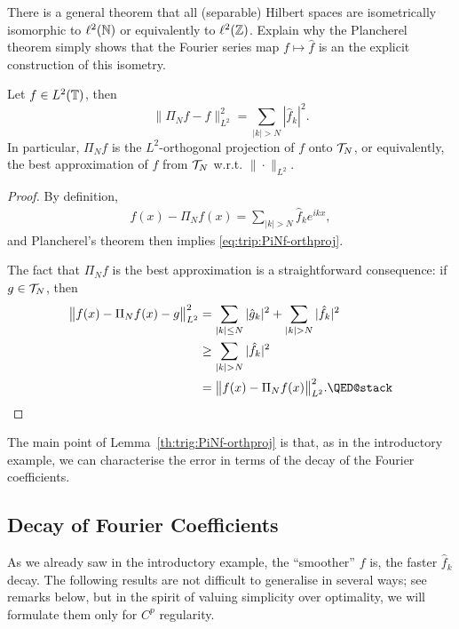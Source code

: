 \begin{remark}
  There is a general theorem that all (separable) Hilbert spaces are
  isometrically isomorphic to $\ell^2(\mathbb{N})$ or equivalently to $\ell^2(\mathbb{Z})$.
  Explain why the Plancherel theorem simply shows that the Fourier series map
  $f \mapsto \hat{f}$ is an the explicit construction of this isometry.
\end{remark}


\begin{proposition} \label{th:trig:PiNf-orthproj}
  Let $f \in L^2(\mathbb{T})$, then
  \begin{equation} \label{eq:trip:PiNf-orthproj}
    \| \Pi_N f - f \|_{L^2}^2 = \sum_{|k| > N} |\hat{f}_k|^2.
  \end{equation}
  In particular, $\Pi_N f$ is the $L^2$-orthogonal
  projection of $f$ onto $\mathcal{T}_N$, or equivalently, the
  best approximation of $f$ from $\mathcal{T}_N$ w.r.t. $\|\cdot\|_{L^2}$.
\end{proposition}
\begin{proof}
  By definition,
  \begin{align*}
    f(x) - \Pi_N f(x) = \sum_{|k|>N} \hat{f}_k e^{ikx},
  \end{align*}
  and Plancherel's theorem then implies \eqref{eq:trip:PiNf-orthproj}.

  The fact that $\Pi_N f$ is the best approximation is a straightforward
  consequence: if $g \in \mathcal{T}_N$, then
  \begin{align*}
    \b\|f(x) - \Pi_N f(x) - g\b\|_{L^2}^2
    &= \sum_{|k| \leq N} |\hat{g}_k|^2 + \sum_{|k| > N} |\hat{f}_k|^2 \\
    &\geq \sum_{|k| > N} |\hat{f}_k|^2 \\
    &= \b\|f(x) - \Pi_N f(x) \b\|_{L^2}^2. \qedhere
  \end{align*}
\end{proof}

The main point of Lemma~\ref{th:trig:PiNf-orthproj} is that, as in the
introductory example, we can characterise the error in terms of the
decay of the Fourier coefficients.



\subsection{Decay of Fourier Coefficients}
%
\label{sec:trig:decay}
%
As we already saw in the introductory example, the ``smoother'' $f$ is, the
faster $\hat{f}_k$ decay. The following results are not difficult to generalise
in several ways; see remarks below, but in the spirit of valuing simplicity over
optimality, we will formulate them only for $C^p$ regularity.

